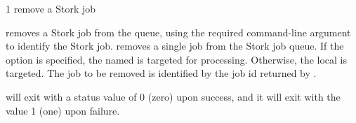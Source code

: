 \begin{ManPage}{\label{man-stork-rm}}{1}
{remove a Stork job}
\Synopsis {}
\ToolArgsBase

\Storkname
{}



\Description 

 removes a Stork job from the queue,
using the required command-line argument to identify the Stork job.
 removes a single job from the Stork job queue.  
If the  option is specified, the named  is targeted
for processing.  Otherwise, the local  is targeted.
The job to be removed is identified by the job id returned by  .

\begin{Options}
	\ToolArgsBaseDesc
	\StorknameDesc
\end{Options}

\ExitStatus

 will exit with a status value of 0 (zero) upon success,
and it will exit with the value 1 (one) upon failure.

\end{ManPage}
